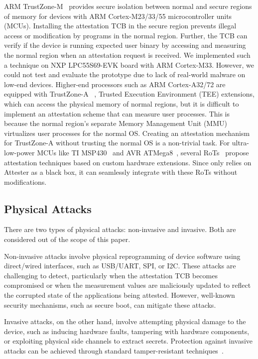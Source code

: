 ARM TrustZone-M~\cite{ARM-TrustZone-M} provides secure isolation between normal and secure regions of memory for devices with ARM Cortex-M23/33/55 microcontroller units (MCUs). Installing the attestation TCB in the secure region prevents illegal access or modification by programs in the normal region. Further, the TCB can verify if the device is running expected user binary by accessing and measuring the normal region when an attestation request is received. We implemented such a technique on NXP LPC55S69-EVK \cite{nxpboard} board with ARM Cortex-M33. However, we could not test and evaluate the prototype due to lack of real-world malware on low-end devices. Higher-end processors such as ARM Cortex-A32/72 are equipped with TrustZone-A  ~\cite{trustzone}, Trusted Execution Environment (TEE) extensions, which can access the physical memory of normal regions, but it is difficult to implement an attestation scheme that can measure user processes. This is because the normal region's separate Memory Management Unit (MMU) virtualizes user processes for the normal OS. Creating an attestation mechanism for TrustZone-A without trusting the normal OS is a non-trivial task. For ultra-low-power MCUs like TI MSP430~\cite{msp_memory_specs} and AVR ATMega8~\cite{atmel_specs}, several RoTs~\cite{smart,sancus,vrasedp,trustlite} propose attestation techniques based on custom hardware extensions. Since \system{} only relies on Attester as a black box, it can seamlessly integrate with these RoTs without modifications.

\subsection{Physical Attacks}
There are two types of physical attacks: non-invasive and invasive. Both are considered out of the scope of this paper.

Non-invasive attacks involve physical reprogramming of device software using direct/wired interfaces, such as USB/UART, SPI, or I2C. These attacks are challenging to detect, particularly when the attestation TCB becomes compromised or when the measurement values are maliciously updated to reflect the corrupted state of the applications being attested. 
However, well-known security mechanisms, such as secure boot, can mitigate these attacks.

Invasive attacks, on the other hand, involve attempting physical damage to the device, such as inducing hardware faults, tampering with hardware components, or exploiting physical side channels to extract secrets. Protection against invasive attacks can be achieved through standard tamper-resistant techniques~\cite{ravi2004tamper}.

